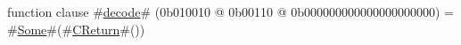 function clause #\hyperref[zdecode]{decode}# (0b010010 @ 0b00110 @ 0b000000000000000000000) = #\hyperref[zSome]{Some}#(#\hyperref[zCReturn]{CReturn}#())
